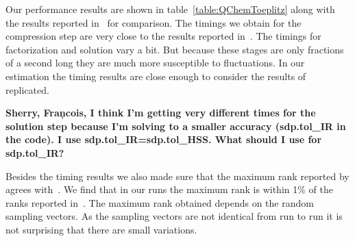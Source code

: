 \documentclass{acmsmall}
\newcommand{\dmcomment}[1]{\textbf{#1}}
\begin{document}
Our performance results are shown in
table~\ref{table:QChemToeplitz} along with the results reported
in~\cite{rouet:strumpack} for comparison.  The timings we obtain
for the compression step are very close to the results reported
in~\cite{rouet:strumpack}.  The timings for factorization and
solution vary a bit.  But because these stages are only fractions
of a second long they are much more susceptible to fluctuations.
In our estimation the timing results are close enough to consider
the results of~\cite{rouet:strumpack} replicated.
\begin{table}
\label{table:QChemToeplitz}
\end{table}
\dmcomment{Sherry, Fran\c{}cois, I think I'm getting very different
  times for the solution step because I'm solving to a smaller
  accuracy (sdp.tol\_IR in the code).  I use
  sdp.tol\_IR=sdp.tol\_HSS.  What should I use for sdp.tol\_IR?}

Besides the timing results we also made sure that the maximum
rank reported by \strumpack{} agrees with~\cite{rouet:strumpack}.
We find that in our runs the maximum rank is within 1\% of the
ranks reported in~\cite{rouet:strumpack}.  The maximum rank
obtained depends on the random sampling vectors.  As the sampling
vectors are not identical from run to run it is not surprising
that there are small variations.
\end{document}
